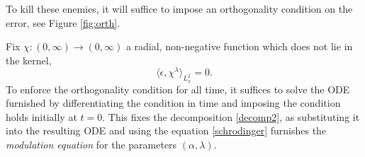 To kill these enemies, it will suffice to impose an orthogonality condition on the error, see Figure \ref{fig:orth}. 


Fix $\chi : (0, \infty ) \to (0, \infty)$ a radial, non-negative function which does not lie in the kernel, 
    \begin{equation}\label{eq:orthogonal1}
        \big\langle \epsilon, \chi^\lambda \big\rangle_{L^2_x} 
            = 0.
    \end{equation}
To enforce the orthogonality condition for all time, it suffices to solve the ODE furnished by differentiating the condition in time and imposing the condition holds initially at $t = 0$. This fixes the decomposition \eqref{decomp2}, as substituting it into the resulting ODE and using the equation \eqref{schrodinger} furnishes the \textit{modulation equation} for the parameters $(\alpha, \lambda)$. 

